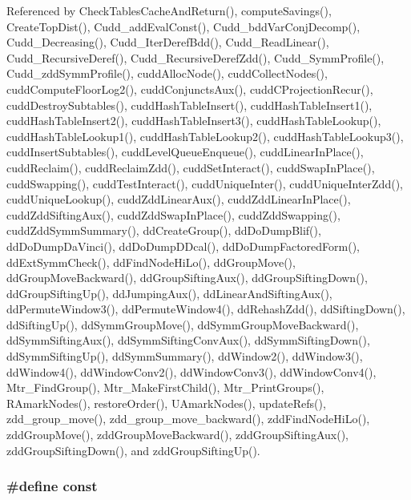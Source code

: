 Referenced by Check\-Tables\-Cache\-And\-Return(), compute\-Savings(), Create\-Top\-Dist(), Cudd\_\-add\-Eval\-Const(), Cudd\_\-bdd\-Var\-Conj\-Decomp(), Cudd\_\-Decreasing(), Cudd\_\-Iter\-Deref\-Bdd(), Cudd\_\-Read\-Linear(), Cudd\_\-Recursive\-Deref(), Cudd\_\-Recursive\-Deref\-Zdd(), Cudd\_\-Symm\-Profile(), Cudd\_\-zdd\-Symm\-Profile(), cudd\-Alloc\-Node(), cudd\-Collect\-Nodes(), cudd\-Compute\-Floor\-Log2(), cudd\-Conjuncts\-Aux(), cudd\-CProjection\-Recur(), cudd\-Destroy\-Subtables(), cudd\-Hash\-Table\-Insert(), cudd\-Hash\-Table\-Insert1(), cudd\-Hash\-Table\-Insert2(), cudd\-Hash\-Table\-Insert3(), cudd\-Hash\-Table\-Lookup(), cudd\-Hash\-Table\-Lookup1(), cudd\-Hash\-Table\-Lookup2(), cudd\-Hash\-Table\-Lookup3(), cudd\-Insert\-Subtables(), cudd\-Level\-Queue\-Enqueue(), cudd\-Linear\-In\-Place(), cudd\-Reclaim(), cudd\-Reclaim\-Zdd(), cudd\-Set\-Interact(), cudd\-Swap\-In\-Place(), cudd\-Swapping(), cudd\-Test\-Interact(), cudd\-Unique\-Inter(), cudd\-Unique\-Inter\-Zdd(), cudd\-Unique\-Lookup(), cudd\-Zdd\-Linear\-Aux(), cudd\-Zdd\-Linear\-In\-Place(), cudd\-Zdd\-Sifting\-Aux(), cudd\-Zdd\-Swap\-In\-Place(), cudd\-Zdd\-Swapping(), cudd\-Zdd\-Symm\-Summary(), dd\-Create\-Group(), dd\-Do\-Dump\-Blif(), dd\-Do\-Dump\-Da\-Vinci(), dd\-Do\-Dump\-DDcal(), dd\-Do\-Dump\-Factored\-Form(), dd\-Ext\-Symm\-Check(), dd\-Find\-Node\-Hi\-Lo(), dd\-Group\-Move(), dd\-Group\-Move\-Backward(), dd\-Group\-Sifting\-Aux(), dd\-Group\-Sifting\-Down(), dd\-Group\-Sifting\-Up(), dd\-Jumping\-Aux(), dd\-Linear\-And\-Sifting\-Aux(), dd\-Permute\-Window3(), dd\-Permute\-Window4(), dd\-Rehash\-Zdd(), dd\-Sifting\-Down(), dd\-Sifting\-Up(), dd\-Symm\-Group\-Move(), dd\-Symm\-Group\-Move\-Backward(), dd\-Symm\-Sifting\-Aux(), dd\-Symm\-Sifting\-Conv\-Aux(), dd\-Symm\-Sifting\-Down(), dd\-Symm\-Sifting\-Up(), dd\-Symm\-Summary(), dd\-Window2(), dd\-Window3(), dd\-Window4(), dd\-Window\-Conv2(), dd\-Window\-Conv3(), dd\-Window\-Conv4(), Mtr\_\-Find\-Group(), Mtr\_\-Make\-First\-Child(), Mtr\_\-Print\-Groups(), RAmark\-Nodes(), restore\-Order(), UAmark\-Nodes(), update\-Refs(), zdd\_\-group\_\-move(), zdd\_\-group\_\-move\_\-backward(), zdd\-Find\-Node\-Hi\-Lo(), zdd\-Group\-Move(), zdd\-Group\-Move\-Backward(), zdd\-Group\-Sifting\-Aux(), zdd\-Group\-Sifting\-Down(), and zdd\-Group\-Sifting\-Up().
\subsubsection{\setlength{\rightskip}{0pt plus 5cm}\#define const}\label{util_8h_2c212835823e3c54a8ab6d95c652660e}




